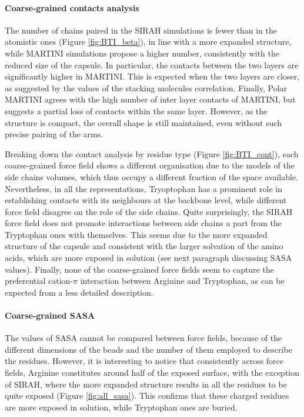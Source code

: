 \paragraph{Coarse-grained contacts analysis}
The number of chains paired in the SIRAH simulations is fewer than in the atomistic ones (Figure \ref{fig:BTI_beta}), in line with a more expanded structure, while MARTINI simulations propose a higher number, consistently with the reduced size of the capsule. In particular, the contacts between the two layers are significantly higher in MARTINI. This is expected when the two layers are closer, as suggested by the values of the stacking molecules correlation. Finally, Polar MARTINI agrees with the high number of inter layer contacts of MARTINI, but suggests a partial loss of contacts within the same layer. However, as the structure is compact, the overall shape is still maintained, even without such precise pairing of the arms.

Breaking down the contact analysis by residue type (Figure \ref{fig:BTI_cont}), each coarse-grained force field shows a different organisation due to the models of the side chains volumes, which thus occupy a different fraction of the space available.
%
Nevertheless, in all the representations, Tryoptophan has a prominent role in establishing contacts with its neighbours at the backbone level, while different force field disagree on the role of the side chains. Quite surprisingly, the SIRAH force field does not promote interactions between side chains a part from the Tryptophan ones with themselves. This seems due to the more expanded structure of the capsule and consistent with the larger solvation of the amino acids, which are more exposed in solution (see next paragraph discussing SASA values).
%
Finally, none of the coarse-grained force fields seem to capture the preferential cation-$\pi$ interaction between Arginine and Tryptophan, as can be expected from a less detailed description.

\paragraph{Coarse-grained SASA} The values of SASA cannot be compared between force fields, because of the different dimensions of the beads and the number of them employed to describe the residues. However, it is interesting to notice that consistently across force fields, Arginine constitutes around half of the exposed surface, with the exception of SIRAH, where the more expanded structure results in all the residues to be quite exposed (Figure \ref{fig:all_sasa}). This confirms that these charged residues are more exposed in solution, while Tryptophan ones are buried.

